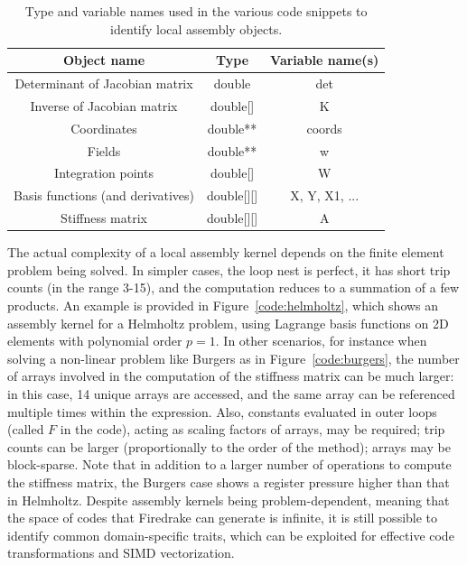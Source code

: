 \documentclass[conference]{IEEEtran}
\begin{document}
\begin{table}[h]
\begin{center}
\begin{tabulary}{1.0\columnwidth}{|C|C|C|}
\hline
Object name & Type & Variable name(s) \\\hline\hline
Determinant of Jacobian matrix & double & det  \\ \hline
Inverse of Jacobian matrix & double[] & K \\ \hline
Coordinates & double** & coords\\ \hline
Fields & double** & w \\ \hline
Integration points & double[] & W \\ \hline
Basis functions (and derivatives) & double[][] & X, Y, X1, ... \\ \hline
Stiffness matrix & double[][] & A\\ \hline
\end{tabulary}
\end{center}
\caption{Type and variable names used in the various code snippets to identify local assembly objects.}
\label{table:map-name-letters}
\end{table}

The actual complexity of a local assembly kernel depends on the finite element problem being solved. In simpler cases, the loop nest is perfect, it has short trip counts (in the range 3-15), and the computation reduces to a summation of a few products. An example is provided in Figure~\ref{code:helmholtz}, which shows an assembly kernel for a Helmholtz problem, using Lagrange basis functions on 2D elements with polynomial order $p=1$. In other scenarios, for instance when solving a non-linear problem like Burgers as in Figure~\ref{code:burgers}, the number of arrays involved in the computation of the stiffness matrix can be much larger: in this case, 14 unique arrays are accessed, and the same array can be referenced multiple times within the expression. Also, constants evaluated in outer loops (called $F$ in the code), acting as scaling factors of arrays, may be required; trip counts can be larger (proportionally to the order of the method); arrays may be block-sparse. Note that in addition to a larger number of operations to compute the stiffness matrix, the Burgers case shows a register pressure higher than that in Helmholtz. Despite assembly kernels being problem-dependent, meaning that the space of codes that Firedrake can generate is infinite, it is still possible to identify common domain-specific traits, which can be exploited for effective code transformations and SIMD vectorization.
\end{document}

